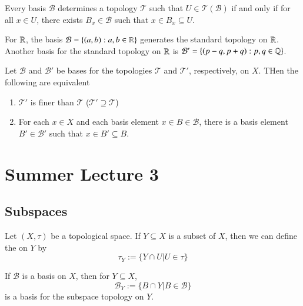 \documentclass[12pt, a4paper, oneside, openright, titlepage]{book}
\begin{document}
\begin{lem}
    Every basis $\mathcal{B}$ determines a topology $\mathcal{T}$ such that $U \in \mathcal{T}(\mathcal{B})$ if and only if for all $x \in U$, there exists $B_x \in \mathcal{B}$ such that $x \in B_x \subseteq U$. 
\end{lem}

\begin{eg}
    For $\mathbb R$, the basis $\mathcal{B} = \{(a,b):a, b\in \mathbb R\}$ generates the standard topology on $\mathbb R$. Another basis for the standard topology on $\mathbb R$ is $\mathcal{B}' = \{(p-q,p+q):p,q \in \mathbb Q\}$.
\end{eg}


\begin{lem}
    Let $\mathcal{B}$ and $\mathcal{B}'$ be bases for the topologies $\mathcal{T}$ and $\mathcal{T}'$, respectively, on $X$. THen the following are equivalent \begin{enumerate}
        \item $\mathcal{T}'$ is finer than $\mathcal{T}$ ($\mathcal{T}'\supseteq \mathcal{T}$)
        \item For each $x \in X$ and each basis element $x \in B \in \mathcal{B}$, there is a basis element $B' \in \mathcal{B}'$ such that $x \in B'\subseteq B$.
    \end{enumerate}
\end{lem}


\section{Summer Lecture 3} 

\subsection{Subspaces}

\begin{defn}
    Let $(X,\tau)$ be a topological space. If $Y \subseteq X$ is a subset of $X$, then we can define the  on $Y$ by \begin{equation*}
        \tau_Y := \{Y\cap U\vert U \in \tau\}
    \end{equation*}
\end{defn}

\begin{lem}
    If $\mathcal{B}$ is a basis on $X$, then for $Y \subseteq X$, \begin{equation*}
        \mathcal{B}_Y := \{B\cap Y\vert B\in \mathcal{B}\}
    \end{equation*}
    is a basis for the subspace topology on $Y$.
\end{lem}
\end{document}
